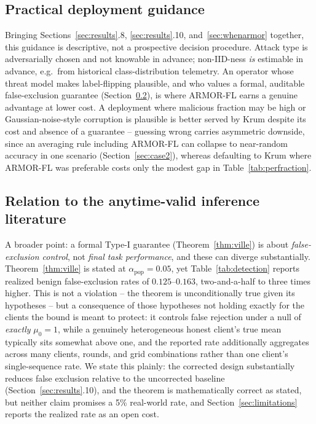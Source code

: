 \documentclass[pdflatex,iicol,sn-mathphys-num]{sn-jnl}%
\theoremstyle{thmstyleone}%
\theoremstyle{thmstyletwo}%
\theoremstyle{thmstylethree}%
\begin{document}
\subsection{Practical deployment guidance}\label{sec:deployment}

Bringing Sections~\ref{sec:results}.8, \ref{sec:results}.10, and~\ref{sec:whenarmor} together, this guidance is descriptive, not a prospective decision procedure. Attack type is adversarially chosen and not knowable in advance; non-IID-ness \emph{is} estimable in advance, e.g.\ from historical class-distribution telemetry. An operator whose threat model makes label-flipping plausible, and who values a formal, auditable false-exclusion guarantee (Section~\ref{sec:relatville}), is where ARMOR-FL earns a genuine advantage at lower cost. A deployment where malicious fraction may be high or Gaussian-noise-style corruption is plausible is better served by Krum despite its cost and absence of a guarantee -- guessing wrong carries asymmetric downside, since an averaging rule including ARMOR-FL can collapse to near-random accuracy in one scenario (Section~\ref{sec:case2}), whereas defaulting to Krum where ARMOR-FL was preferable costs only the modest gap in Table~\ref{tab:perfraction}.

\subsection{Relation to the anytime-valid inference literature}\label{sec:relatville}

A broader point: a formal Type-I guarantee (Theorem~\ref{thm:ville}) is about \emph{false-exclusion control}, not \emph{final task performance}, and these can diverge substantially. Theorem~\ref{thm:ville} is stated at $\alpha_{\mathrm{pop}}=0.05$, yet Table~\ref{tab:detection} reports realized benign false-exclusion rates of $0.125$--$0.163$, two-and-a-half to three times higher. This is not a violation -- the theorem is unconditionally true given its hypotheses -- but a consequence of those hypotheses not holding exactly for the clients the bound is meant to protect: it controls false rejection under a null of \emph{exactly} $\mu_0=1$, while a genuinely heterogeneous honest client's true mean typically sits somewhat above one, and the reported rate additionally aggregates across many clients, rounds, and grid combinations rather than one client's single-sequence rate. We state this plainly: the corrected design substantially reduces false exclusion relative to the uncorrected baseline (Section~\ref{sec:results}.10), and the theorem is mathematically correct as stated, but neither claim promises a 5\% real-world rate, and Section~\ref{sec:limitations} reports the realized rate as an open cost.
\end{document}
